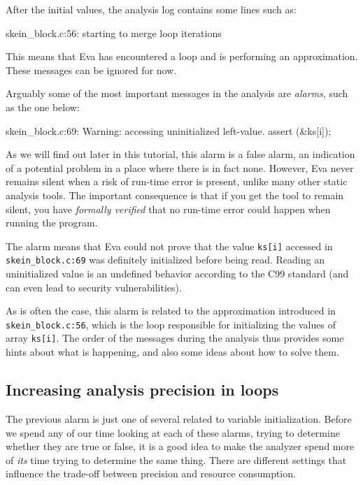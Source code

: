 \documentclass[web]{frama-c-book}
\newcommand{\isoc}{\textsf{C99}}
\newcommand{\Eva}{\textsf{Eva}}
\begin{document}
After the initial values, the analysis log contains some lines such as:

\begin{logs}
[eva] skein_block.c:56: starting to merge loop iterations
\end{logs}

This means that \Eva{} has encountered a loop and is performing an
approximation. These messages can be ignored for now.

Arguably some of the most important messages in the analysis are {\em alarms},
such as the one below:

\begin{logs}
 skein_block.c:69: Warning:
  accessing uninitialized left-value. assert \initialized(&ks[i]);
\end{logs}

As we will find out later in this tutorial, this alarm is a false
alarm, an indication of a potential problem in a place where there is
in fact none. However, \Eva{} never remains
silent when a risk of run-time error is present, unlike many other
static analysis tools. The important consequence is that if you get
the tool to remain silent, you have {\em formally verified} that
no run-time error could happen when running the program.

The alarm means that \Eva{} could not prove that the value \verb|ks[i]|
accessed in \verb|skein_block.c:69| was definitely initialized before being
read. Reading an uninitialized value is an undefined behavior according to the
\isoc{} standard (and can even lead to security vulnerabilities).

As is often the case, this alarm is related to the approximation introduced
in \verb|skein_block.c:56|, which is the loop responsible for initializing
the values of array \verb|ks[i]|. The order of the messages during the
analysis thus provides some hints about what is happening, and also some
ideas about how to solve them.

\subsection{Increasing analysis precision in loops}

The previous alarm is just one of several related to variable initialization.
Before we spend any of our time looking at each of these alarms,
trying to determine whether they are true or false,
it is a good idea to make the analyzer spend more of {\em its} time
trying to determine the same thing.
There are different settings that influence the trade-off
between precision and resource consumption.
\end{document}
